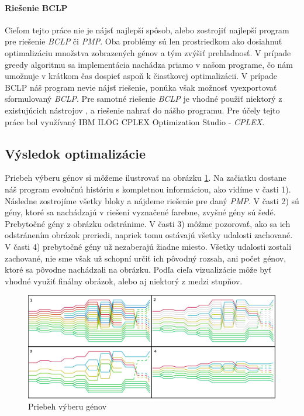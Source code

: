 \paragraph{Riešenie BCLP}
Cieľom tejto práce nie je nájsť najlepší spôsob,
alebo zostrojiť najlepší program pre riešenie \emph{BCLP} či \emph{PMP}.
Oba problémy sú len prostriedkom ako dosiahnuť optimalizáciu množstva zobrazených génov a tým zvýšiť prehľadnosť.
V prípade greedy algoritmu sa implementácia nachádza priamo v našom programe,
čo nám umožnuje v krátkom čas dospieť aspoň k čiastkovej optimalizácii.
V prípade BCLP náš program nevie nájsť riešenie, ponúka však možnosť vyexportovať sformulovaný \emph{BCLP}.
Pre samotné riešenie \emph{BCLP} je vhodné použiť niektorý z existujúcich nástrojov \cite{wiki:lp}, 
a riešenie nahrať do nášho programu. Pre účely tejto práce bol využívaný IBM ILOG CPLEX Optimization Studio - \emph{CPLEX}\cite{cplex}.
\subsection{Výsledok optimalizácie}
Priebeh výberu génov si môžeme ilustrovať na obrázku \ref{obr:opt}.
Na začiatku dostane náš program evolučnú históriu s kompletnou informáciou, ako vidíme v časti 1).
Následne zostrojíme všetky bloky a nájdeme riešenie pre daný \emph{PMP}.
V časti 2) sú gény, ktoré sa nachádzajú v riešení vyznačené farebne, zvyšné gény sú šedé.
Prebytočné gény z obrázku odstránime. V časti 3) môžme pozorovať, ako sa ich odstránením obrázok preriedi, 
napriek tomu ostávajú všetky udalosti zachované.
V časti 4) prebytočné gény už nezaberajú žiadne miesto. Všetky udalosti zostali zachované,
nie sme však už schopní určiť ich pôvodný rozsah, ani počet génov, ktoré sa pôvodne nachádzali na obrázku.
Podľa cieľa vizualizácie môže byť vhodné využiť finálny obrázok, alebo aj niektorý z medzi stupňov.
\begin{figure}[t]
 \centering
\includegraphics[width=1.1\textwidth]{images/optimalizacia}
\caption{Priebeh výberu génov}\label{obr:opt}
\end{figure}

